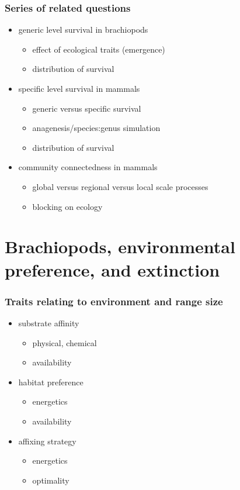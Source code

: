 \documentclass{beamer} \usepackage{amsmath,amsthm}
\begin{document}
\begin{frame}
  \frametitle{Series of related questions}

  \begin{itemize}
    \item generic level survival in brachiopods %
      \begin{itemize}
        \item effect of ecological traits (emergence)
        \item distribution of survival
      \end{itemize}
    \item specific level survival in mammals
      \begin{itemize}
        \item generic versus specific survival
        \item anagenesis/species:genus simulation
        \item distribution of survival
      \end{itemize}
    \item community connectedness in mammals
      \begin{itemize}
        \item global versus regional versus local scale processes
        \item blocking on ecology
      \end{itemize}
  \end{itemize}
\end{frame}


\section{Brachiopods, environmental preference, and extinction}

\begin{frame}
  \frametitle{Traits relating to environment and range size}

  \begin{itemize}
    \item substrate affinity
      \begin{itemize}
        \item physical, chemical
        \item availability
      \end{itemize}
    \item habitat preference
      \begin{itemize}
        \item energetics
        \item availability
      \end{itemize}
    \item affixing strategy
      \begin{itemize}
        \item energetics
        \item optimality
      \end{itemize}
  \end{itemize}
\end{frame}
\end{document}
